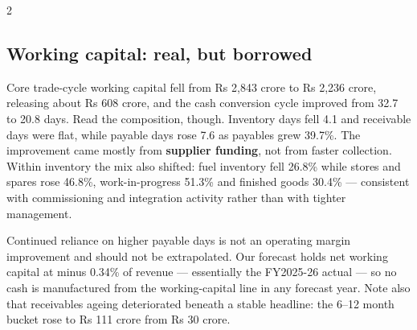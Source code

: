 \begin{paracol}{2}
\subsection{Working capital: real, but borrowed}

Core trade-cycle working capital fell from Rs 2,843 crore to Rs 2,236 crore, releasing
about Rs 608 crore, and the cash conversion cycle improved from 32.7 to 20.8 days.
Read the composition, though. Inventory days fell 4.1 and receivable days were flat,
while payable days rose 7.6 as payables grew 39.7\%. The improvement came mostly from
\textbf{supplier funding}, not from faster collection. Within inventory the mix also
shifted: fuel inventory fell 26.8\% while stores and spares rose 46.8\%,
work-in-progress 51.3\% and finished goods 30.4\% — consistent with commissioning and
integration activity rather than with tighter management.

\begin{okbox}
Continued reliance on higher payable days is not an operating margin improvement and
should not be extrapolated. Our forecast holds net working capital at minus 0.34\% of
revenue — essentially the FY2025-26 actual — so no cash is manufactured from the
working-capital line in any forecast year. Note also that receivables ageing
deteriorated beneath a stable headline: the 6--12 month bucket rose to Rs 111 crore
from Rs 30 crore.
\end{okbox}

\switchcolumn
{}




\end{paracol}
